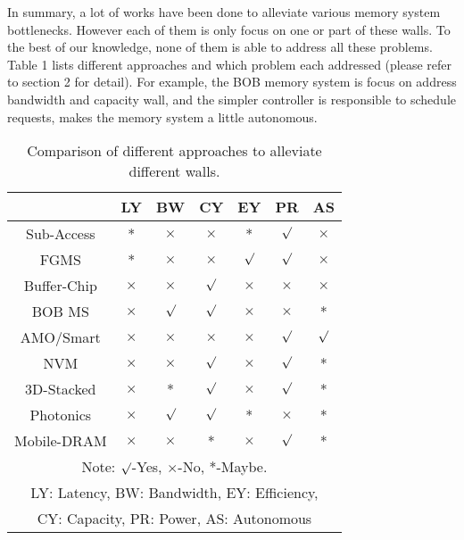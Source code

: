 \documentclass[pageno]{jpaper}
\begin{document}
In summary, a lot of works have been done to alleviate various memory system bottlenecks. However each of them is only focus on one or part of these walls. To the best of our knowledge, none of them is able to address all these problems. Table 1 lists different approaches and which problem each addressed (please refer to section 2 for detail). For example, the BOB \cite{BOBMemory} memory system is focus on address bandwidth and capacity wall, and the simpler controller is responsible to schedule requests, makes the memory system a little autonomous.

\begin{table}[h!]
  \centering
  \begin{tabular}{|c|c|c|c|c|c|c|}
    \hline
    \textbf{} & \textbf{LY} & \textbf{BW} & \textbf{CY} & \textbf{EY} & \textbf{PR} & \textbf{AS}\\
    \hline
    \hline
Sub-Access & * & $\times$ & $\times$ & * & ${\surd}$ & ${\times}$\\
    \hline
    FGMS & * & $\times$ & $\times$ & ${\surd}$ & ${\surd}$ & $\times$\\
    \hline
    Buffer-Chip & $\times$ & $\times$ & ${\surd}$ & $\times$ & $\times$ & $\times$\\
    \hline
    BOB MS & $\times$ & ${\surd}$ & ${\surd}$ & $\times$ & $\times$ & *\\
    \hline
    AMO/Smart & $\times$ & $\times$ & $\times$ & $\times$ & ${\surd}$ & ${\surd}$\\
    \hline
    NVM & $\times$ & $\times$ & ${\surd}$ & $\times$ & ${\surd}$ & *\\
    \hline
    3D-Stacked & $\times$ & * & ${\surd}$ & $\times$ & ${\surd}$ & *\\
    \hline
    Photonics & $\times$ & ${\surd}$ & ${\surd}$ & * & $\times$ & *\\
    \hline
    Mobile-DRAM & $\times$ & $\times$ & * & $\times$ & ${\surd}$ & *\\
    \hline
    \hline
    \multicolumn{7}{|c|}{Note: ${\surd}$-Yes, $\times$-No, *-Maybe.} \\
\multicolumn{7}{|c|}{ LY: Latency, BW: Bandwidth, EY: Efficiency,} \\
\multicolumn{7}{|c|}{CY: Capacity, PR: Power, AS: Autonomous} \\
    \hline
\end{tabular}
\caption{Comparison of different approaches to alleviate different walls. }
  \label{table:formatting}
\end{table}
\end{document}
